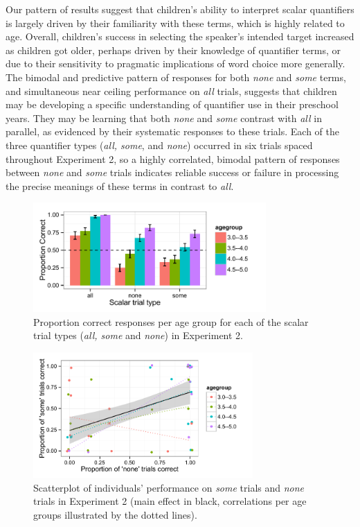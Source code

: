 \documentclass[10pt,letterpaper]{article}
\begin{document}
Our pattern of results suggest that children's ability to interpret scalar quantifiers is largely driven by their familiarity with these terms, which is highly related to age. Overall, children's success in selecting the speaker's intended target increased as children got older, perhaps driven by their knowledge of quantifier terms, or due to their sensitivity to pragmatic implications of word choice more generally. The bimodal and predictive pattern of responses for both \emph{none} and \emph{some} terms, and simultaneous near ceiling performance on \emph{all} trials, suggests that children may be developing a specific understanding of quantifier use in their preschool years. They may be learning that both \emph{none} and \emph{some} contrast with \emph{all} in parallel, as evidenced by their systematic responses to these trials. Each of the three quantifier types (\emph{all, some}, and \emph{none}) occurred in six trials spaced throughout Experiment 2, so a highly correlated, bimodal pattern of responses between \emph{none} and \emph{some} trials indicates reliable success or failure in processing the precise meanings of these terms in contrast to \emph{all}.


\begin{figure}[t] 
  \begin{center} 
    \includegraphics[width=3.5in]{figures/implicatures_scalarOnly_clean.pdf} 
    \caption{\label{fig:expt2} Proportion correct responses per age group for each of the scalar trial types (\emph{all, some} and \emph{none}) in Experiment 2.     }
    \end{center} 
\vspace{-1ex} 
\end{figure}

\begin{figure}[h] 
  \begin{center} 
    \includegraphics[width=3.3in]{figures/implicatures_scalarOnly_scatterplot.pdf} 
    \caption{\label{fig:expt2scatterplot} Scatterplot of individuals' performance on \emph{some} trials and \emph{none} trials in Experiment 2 (main effect in black, correlations per age groups illustrated by the dotted lines). }
    \end{center} 
\vspace{-1ex} 
\end{figure}
\end{document}
